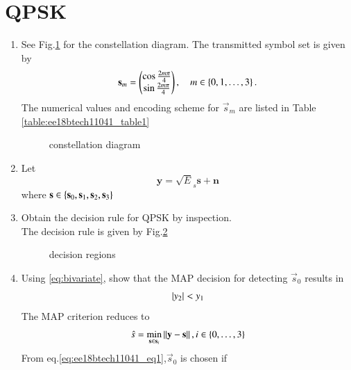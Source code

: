 \documentclass[journal,12pt,twocolumn]{IEEEtran}
\renewcommand\thesection{\arabic{section}}
\begin{document}
\section{QPSK}
\begin{enumerate}[label=\arabic*.,ref=\thesection.\theenumi]
%
\item See Fig.\ref{fig:ee18btech11041_fig1} for the constellation diagram.  The transmitted symbol set is given by 
\begin{align}
\mathbf{s}_m = \begin{pmatrix}\cos \frac{2m\pi}{4}\\ \sin \frac{2m\pi}{4}\end{pmatrix}, \quad m \in \left\{0, 1, \dots, 3\right\}.
\end{align}
%
The numerical values and encoding scheme for $\vec{s}_m$ are listed in Table \ref{table:ee18btech11041_table1}

\begin{figure}[!ht]
                \resizebox{\columnwidth}{!}{}

\caption{constellation diagram}
\label{fig:ee18btech11041_fig1}
\end{figure}
\begin{table}[!ht]
\centering

\caption{}
\label{table:ee18btech11041_table1}
\end{table}
\item Let
\begin{equation}
\label{eq:qpsk_rx}
\mathbf{y} = \sqrt{E}_s\mathbf{s}+ \mathbf{n}
\end{equation}
where $\mathbf{s} \in \left\{\mathbf{s}_0,\mathbf{s}_1,\mathbf{s}_2, \mathbf{s}_3\right\}$ 
%
\item Obtain the decision rule for QPSK by inspection.
\\
\solution The decision rule is given by Fig.\ref{fig:ee18btech11041_fig2} 

\begin{figure}[!ht]
                \resizebox{\columnwidth}{!}{}
\caption{decision regions}
\label{fig:ee18btech11041_fig2}	
\end{figure}
\item Using \eqref{eq:bivariate}, show that the MAP decision for detecting $\vec{s}_0$ results in
\begin{equation}
\label{eq:qpsk_dec}
\left\vert y_2\right\vert < y_1
\end{equation}
\solution The MAP criterion reduces to 
%
\begin{align}
    \hat{s} = \min_{\mathbf{s} \in \mathbf{s}_i} \left\lVert\mathbf{y} - \mathbf{s}\right\rVert, i \in \left\{0,\dots,3\right\}
    \label{eq:ee18btech11041_eq1}
\end{align}
%
From eq.\ref{eq:ee18btech11041_eq1},$\vec{s}_{0}$ is chosen if


\end{enumerate}
\end{document}
